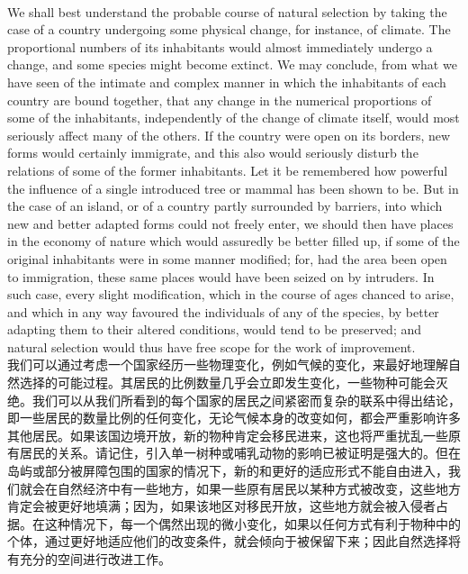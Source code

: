 \documentclass{article}
\begin{document}
\\
We shall best understand the probable course of natural selection by taking the case of a country undergoing some physical change, for instance, of climate. The proportional numbers of its inhabitants would almost immediately undergo a change, and some species might become extinct. We may conclude, from what we have seen of the intimate and complex manner in which the inhabitants of each country are bound together, that any change in the numerical proportions of some of the inhabitants, independently of the change of climate itself, would most seriously affect many of the others. If the country were open on its borders, new forms would certainly immigrate, and this also would seriously disturb the relations of some of the former inhabitants. Let it be remembered how powerful the influence of a single introduced tree or mammal has been shown to be. But in the case of an island, or of a country partly surrounded by barriers, into which new and better adapted forms could not freely enter, we should then have places in the economy of nature which would assuredly be better filled up, if some of the original inhabitants were in some manner modified; for, had the area been open to immigration, these same places would have been seized on by intruders. In such case, every slight modification, which in the course of ages chanced to arise, and which in any way favoured the individuals of any of the species, by better adapting them to their altered conditions, would tend to be preserved; and natural selection would thus have free scope for the work of improvement.\\
我们可以通过考虑一个国家经历一些物理变化，例如气候的变化，来最好地理解自然选择的可能过程。其居民的比例数量几乎会立即发生变化，一些物种可能会灭绝。我们可以从我们所看到的每个国家的居民之间紧密而复杂的联系中得出结论，即一些居民的数量比例的任何变化，无论气候本身的改变如何，都会严重影响许多其他居民。如果该国边境开放，新的物种肯定会移民进来，这也将严重扰乱一些原有居民的关系。请记住，引入单一树种或哺乳动物的影响已被证明是强大的。但在岛屿或部分被屏障包围的国家的情况下，新的和更好的适应形式不能自由进入，我们就会在自然经济中有一些地方，如果一些原有居民以某种方式被改变，这些地方肯定会被更好地填满；因为，如果该地区对移民开放，这些地方就会被入侵者占据。在这种情况下，每一个偶然出现的微小变化，如果以任何方式有利于物种中的个体，通过更好地适应他们的改变条件，就会倾向于被保留下来；因此自然选择将有充分的空间进行改进工作。\\
\end{document}
